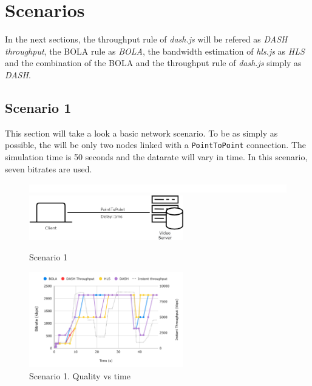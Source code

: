 \section{Scenarios}
\label{sec:scenarios}

In the next sections, the throughput rule of \textit{dash.js} will be refered as \textit{DASH throughput},
the BOLA rule as \textit{BOLA}, the bandwidth estimation of \textit{hls.js} as \textit{HLS} and the combination
of the BOLA and the throughput rule of \textit{dash.js} simply as \textit{DASH}.

\subsection{Scenario 1}
This section will take a look a basic network scenario. To be as simply as possible, the will be 
only two nodes linked with a \texttt{PointToPoint} connection. The simulation time is 50 seconds 
and the datarate will vary in time. In this scenario, seven bitrates are used.

\begin{figure}[h]
    \centering
    \includegraphics[width=\textwidth]{img/space.png}
    \includegraphics[width=0.6\textwidth]{img/scenario1.png}
    \caption{Scenario 1}
    \label{fig:scenario1}
\end{figure}

\begin{figure}[h]
    \centering
    \includegraphics[width=0.6\textwidth]{img/s1c1_1.pdf}
    \caption{Scenario 1. Quality vs time}
    \label{fig:s1c1}
\end{figure}

